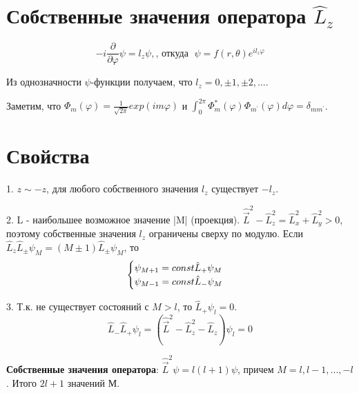 \section{Собственные значения оператора $\hat{L}_z$}
$$-i \frac{\partial}{\partial \varphi} \psi = l_z \psi, \text{, откуда } \; \psi = f(r, \theta) e^{i l_z \varphi}$$
\par Из однозначности $\psi$-функции получаем, что $l_z = 0,\pm1, \pm2,...$.
\par Заметим, что $\Phi_m(\varphi) = \frac{1}{\sqrt{2\pi}} exp (im\varphi)$ и $\int^{2\pi}_0 \Phi^*_m(\varphi) \Phi_{m^\prime}(\varphi) d\varphi = \delta_{m m^\prime } $.
\section{Свойства}
\par 1\textdegree. $z \sim -z$, для любого собственного значения $l_z$ существует $-l_z$.
\par 2\textdegree. L - наибольшее возможное значение |M| (проекция).
$\hat{\vec{L}}^2 - \hat{L}^2_z = \hat{L}^2_x  + \hat{L}^2_y>0$, поэтому собственные значения $l_z$ ограничены сверху по модулю.
Если $\hat{L}_z\hat{L}_{\pm}\psi_M = (M \pm1) \hat{L}_{\pm} \psi_M $, то
\begin{equation*}
 \begin{cases}
    $$ \psi_{M+1} = const \hat{L}_{+} \psi_M $$
\\
    $$ \psi_{M-1} = const \hat{L}_{-} \psi_M $$ 
 \end{cases}
\end{equation*}
\par 3\textdegree. Т.к. не существует состояний с $M>l$, то $\hat{L}_+ \psi_l=0$.
$$\hat{L}_- \hat{L}_+ \psi_l = \left(\hat{\vec{L}}^2- \hat{L}^2_z-\hat{L}_z \right) \psi_l =0$$
\par \textbf{Собственные значения оператора}: $\hat{\vec{L}}^2\psi= l(l+1)\psi$, причем $M=l,l-1, ..., -l$. Итого $2l+1$ значений М.
